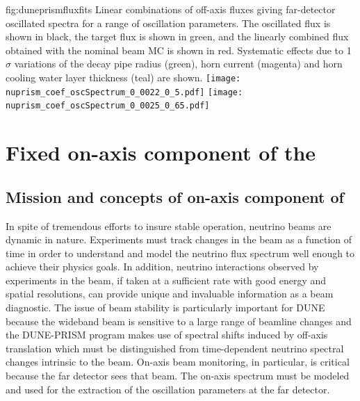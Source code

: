 \begin{dunefigure}{fig:duneprismfluxfits}
{Linear combinations of off-axis fluxes giving far-detector oscillated spectra for a range of oscillation parameters. The   oscillated flux is shown in black, the target flux is shown in green, and the linearly combined flux obtained with the nominal beam MC is shown in red. Systematic effects due to 1 $\sigma$ variations of the decay pipe radius (green), horn current (magenta) and horn cooling water layer thickness (teal) are shown.}
	\texttt{[image: nuprism\_coef\_oscSpectrum\_0\_0022\_0\_5.pdf]}
	\texttt{[image: nuprism\_coef\_oscSpectrum\_0\_0025\_0\_65.pdf]}
\end{dunefigure}




\section{Fixed on-axis component of the  }

\subsection{Mission and concepts of on-axis component of  }
\label{sec:appx-nd:exsum-nd-onaxis-mission}

In spite of tremendous efforts to insure stable operation, neutrino beams are dynamic in nature.  Experiments must track changes in the beam as a function of time in order to  understand and model the neutrino flux spectrum well enough to achieve their physics goals. In addition, neutrino interactions observed by experiments in the beam, if taken at a sufficient rate with good energy and spatial resolutions, can provide unique and invaluable information as a beam diagnostic. The issue of beam stability is particularly important for DUNE because the wideband beam is sensitive to a large range of beamline changes and the DUNE-PRISM program makes use of spectral shifts induced by off-axis translation which must be distinguished from time-dependent neutrino spectral changes intrinsic to the beam.  On-axis beam monitoring, in particular, is critical because the  far detector sees that beam.  The on-axis spectrum must be modeled and used for the extraction of the oscillation parameters at the far detector.  

